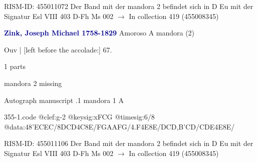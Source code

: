 \documentclass[twocolumn]{book}
\begin{document}
\newline RISM-ID: 455011072
\newline Der Band mit der mandora 2 befindet sich in D Eu mit der Signatur Esl VIII 403
\newline D-Fh  Ms 002
\newline $\rightarrow$ In collection 419 (455008345)

\newline \par \vspace{7pt} \textcolor{darkblue}{\textbf{Zink, Joseph Michael  1758-1829}}
\newline Amoroso  A  
\newline mandora (2)
\newline \begin{itshape}[f.35r, at left:] Ouv | [left before the accolade:] 67.\end{itshape} 
\newline \textcolor{darkblue}{}  1 parts  
\newline \begin{small} mandora 2 missing\end{small} 
\newline Autograph manuscript
.1  mandora 1  A  
\begin{filecontents*}{355-1.code}
@clef:g-2
@keysig:xFCG
@timesig:6/8
@data:48'ECEC/8DCD4C8E/FGAAFG/4.F4E8E/DCD,B'CD/CDE4E8E/
\end{filecontents*}
\newline
%

\newline RISM-ID: 455011106
\newline Der Band mit der mandora 2 befindet sich in D Eu mit der Signatur Esl VIII 403
\newline D-Fh  Ms 002
\newline $\rightarrow$ In collection 419 (455008345)
\end{document}

